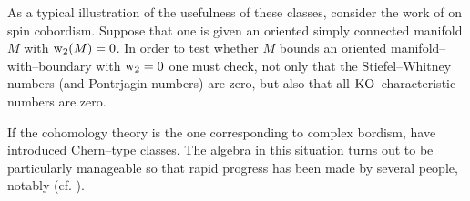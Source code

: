 \documentclass[../main]{subfiles}
\begin{document}
As a typical illustration of the usefulness of these classes, consider the work of \cite{anderson1967} on spin cobordism. Suppose that one is given an oriented simply connected manifold $M$ with $\operatorname{w}_2(M) = 0$. In order to test whether $M$ bounds an oriented manifold--with--boundary with $\operatorname{w}_2 = 0$ one must check, not only that the Stiefel--Whitney numbers (and Pontrjagin numbers) are zero, but also that all $\operatorname{KO}$--characteristic numbers are zero. 

If the cohomology theory is the one corresponding to complex bordism, \cite{connerfloyd} have introduced Chern--type classes. The algebra in this situation turns out to be particularly manageable so that rapid progress has been made by several people, notably \cite{Novikov_1967} (cf. \cite{adams1967}).
\end{document}
